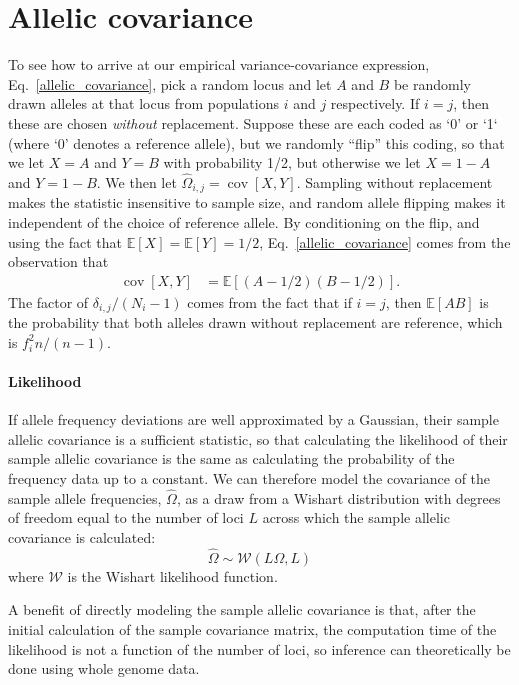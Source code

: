 \documentclass[10pt,letterpaper]{article}
\newcommand{\E}{\mathbb{E}}
\newcommand{\cov}{\mathop{\mbox{cov}}}
\begin{document}
\section*{Allelic covariance}\label{allelic_cov}
To see how to arrive at our empirical variance-covariance expression, Eq.\ \eqref{allelic_covariance},
pick a random locus and
let $A$ and $B$ be randomly drawn alleles at that locus from populations $i$ and $j$ respectively.
If $i=j$, then these are chosen \emph{without} replacement.
Suppose these are each coded as `0' or `1` (where `0' denotes a reference allele),
but we randomly ``flip'' this coding, so that we let $X=A$ and $Y=B$ with probability 1/2,
but otherwise we let $X=1-A$ and $Y=1-B$.
We then let $\widehat{\Omega}_{i,j} = \cov[X,Y]$. 
Sampling without replacement makes the statistic insensitive to sample size,
and random allele flipping makes it independent of the choice of reference allele.
By conditioning on the flip,
and using the fact that $\E[X] = \E[Y] = 1/2$,
Eq.\ \eqref{allelic_covariance} comes from the observation that
\begin{align} \label{eqn:cov_xy}
\cov[X,Y] %
    &= \E[(A-1/2)(B-1/2)] .
\end{align}
The factor of $\delta_{i,j}/(N_i-1)$ comes from the fact that if $i=j$,
then $\E[AB]$ is the probability that both alleles drawn without replacement are reference,
which is $f_i^2 n/(n-1)$.

\paragraph{Likelihood}
If allele frequency deviations are well approximated by a Gaussian, 
their sample allelic covariance is a sufficient statistic,
so that calculating the likelihood of their sample allelic covariance is the same as 
calculating the probability of the frequency data up to a constant. 
We can therefore model the covariance of the sample allele frequencies, $\widehat{\Omega}$, 
as a draw from a Wishart distribution with degrees of freedom equal to 
the number of loci $L$ across which the sample allelic covariance is calculated:
\begin{equation}
\widehat{\Omega} \sim \mathcal{W}\left( L\Omega, L	\right) 
\label{wishart}
\end{equation}
where $\mathcal{W}$ is the Wishart likelihood function.

A benefit of directly modeling the sample allelic covariance is that, 
after the initial calculation of the sample covariance matrix,
the computation time of the likelihood is not a function of the number of loci,
so inference can theoretically be done using whole genome data.
\end{document}
